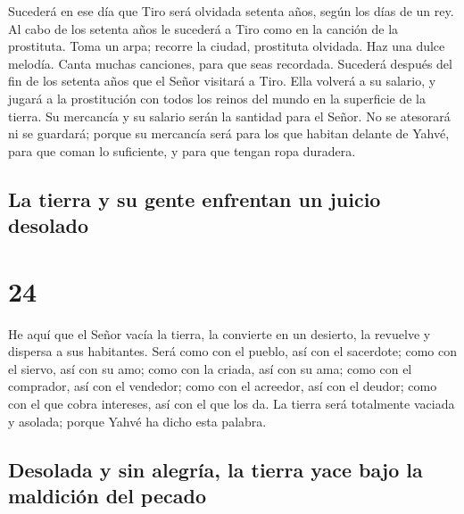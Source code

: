  Sucederá en ese día que Tiro será olvidada setenta años,
según los días de un rey. Al cabo de los setenta años le sucederá a Tiro
como en la canción de la prostituta.  Toma un arpa;
recorre la ciudad, prostituta olvidada. Haz una dulce melodía. Canta
muchas canciones, para que seas recordada.  Sucederá
después del fin de los setenta años que el Señor visitará a Tiro. Ella
volverá a su salario, y jugará a la prostitución con todos los reinos
del mundo en la superficie de la tierra.  Su mercancía y
su salario serán la santidad para el Señor. No se atesorará ni se
guardará; porque su mercancía será para los que habitan delante de
Yahvé, para que coman lo suficiente, y para que tengan ropa duradera.

\hypertarget{la-tierra-y-su-gente-enfrentan-un-juicio-desolado}{%
\subsection{La tierra y su gente enfrentan un juicio
desolado}\label{la-tierra-y-su-gente-enfrentan-un-juicio-desolado}}

\hypertarget{section-23}{%
\section{24}\label{section-23}}

 He aquí que el Señor vacía la tierra, la convierte en un
desierto, la revuelve y dispersa a sus habitantes.  Será
como con el pueblo, así con el sacerdote; como con el siervo, así con su
amo; como con la criada, así con su ama; como con el comprador, así con
el vendedor; como con el acreedor, así con el deudor; como con el que
cobra intereses, así con el que los da.  La tierra será
totalmente vaciada y asolada; porque Yahvé ha dicho esta palabra.

\hypertarget{desolada-y-sin-alegruxeda-la-tierra-yace-bajo-la-maldiciuxf3n-del-pecado}{%
\subsection{Desolada y sin alegría, la tierra yace bajo la maldición del
pecado}\label{desolada-y-sin-alegruxeda-la-tierra-yace-bajo-la-maldiciuxf3n-del-pecado}}

